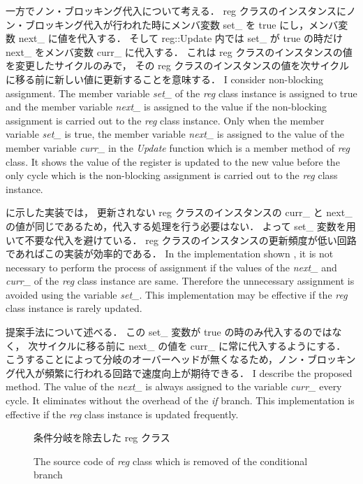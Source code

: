 一方でノン・ブロッキング代入について考える．
reg クラスのインスタンスにノン・ブロッキング代入が行われた時にメンバ変数 set\_ を true にし，メンバ変数 next\_ に値を代入する．
そして reg::Update 内では set\_ が true の時だけ next\_ をメンバ変数 curr\_ に代入する．
これは reg クラスのインスタンスの値を変更したサイクルのみで，
その reg クラスのインスタンスの値を次サイクルに移る前に新しい値に更新することを意味する．
\fi
I consider non-blocking assignment.
The member variable \textit{set\_} of the \textit{reg} class instance is assigned to true
and the member variable \textit{next\_} is assigned to the value
if the non-blocking assignment is carried out to the \textit{reg} class instance.
Only when the member variable \textit{set\_} is true, the member variable \textit{next\_} is assigned to the value of the member variable \textit{curr\_} in the \textit{Update} function which is a member method of \textit{reg} class.
It shows the value of the register is updated to the new value before the only cycle which is the non-blocking assignment is carried out to the \textit{reg} class instance.

 に示した実装では，
更新されない reg クラスのインスタンスの curr\_ と next\_ の値が同じであるため，代入する処理を行う必要はない．
よって set\_ 変数を用いて不要な代入を避けている．
reg クラスのインスタンスの更新頻度が低い回路であればこの実装が効率的である．
\fi
In the implementation shown ,
it is not necessary to perform the process of assignment
if the values of the \textit{next\_} and \textit{curr\_} of the \textit{reg} class instance are same.
Therefore the unnecessary assignment is avoided using the variable \textit{set\_}.
This implementation may be effective if the \textit{reg} class instance is rarely updated.

提案手法について述べる．
この set\_ 変数が true の時のみ代入するのではなく，
次サイクルに移る前に next\_ の値を curr\_ に常に代入するようにする．
こうすることによって分岐のオーバーヘッドが無くなるため，ノン・ブロッキング代入が頻繁に行われる回路で速度向上が期待できる．
\fi
I describe the proposed method.
The value of the \textit{next\_} is always assigned to the variable \textit{curr\_} every cycle.
It eliminates without the overhead of the \textit{if} branch.
This implementation is effective if the \textit{reg} class instance is updated frequently.


\begin{figure}[tb]
 
 \caption{条件分岐を除去した reg クラス}
\fi
 \caption{The source code of \textit{reg} class which is removed of the conditional branch}
 \label{src:reg_no_set}
\end{figure}

